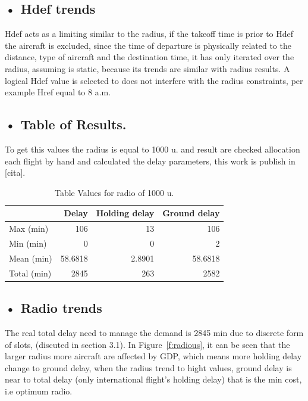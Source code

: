 \documentclass[final,1p]{elsarticle}
\begin{document}
\subsection{• Hdef trends}
\label{subSec:theorical}
Hdef acts as a limiting similar to the radius, if the takeoff time is prior to Hdef the aircraft is excluded, since the time of departure is physically related to the distance, type of aircraft and the destination time, it has only iterated over the radius, assuming is static, because its trends are similar with radius results. A logical Hdef value is selected to does not interfere with the radius constraints, per example Href equal to 8 a.m.

\subsection{• Table of Results.}
\label{subSec:radius}

To get this values the radius is equal to 1000 u. and result are checked allocation each flight by hand and calculated the delay parameters, this work is publish in [cita].

\begin{table}[h]
\centering
\begin{tabular}{|l|r|r|r|}
\hline
& Delay & Holding delay & Ground delay \\
\hline
Max (min)& 106 & 13 & 106 \\
\hline
Min (min)& 0 & 0 & 2 \\
\hline
Mean (min)& 58.6818 & 2.8901 & 58.6818 \\
\hline
Total (min)& 2845 & 263 & 2582  \\
\hline
\end{tabular}
\caption{Table Values for radio of 1000 u.}
\label{tabla:table_values}
\end{table}

\subsection{• Radio trends}
\label{subSec:radius}

The real total delay need to manage the demand is 2845 min due to discrete form of slots, (discuted in section 3.1). In Figure~\ref{f:radious}, it can be seen that the larger radius more aircraft are affected by GDP, which means more holding delay change to ground delay, when the radius trend to hight values, ground delay is near to total delay (only international flight's holding delay) that is the min cost, i.e optimum radio.
\end{document}
